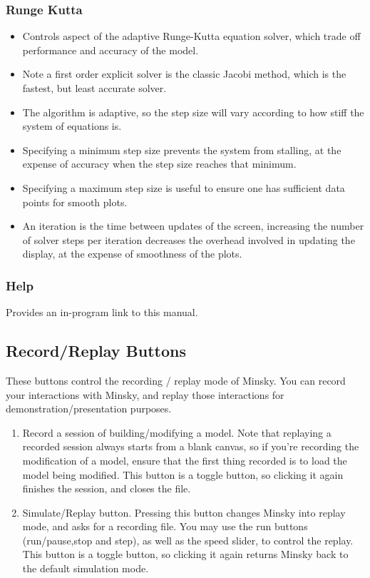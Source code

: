 \subsubsection{Runge Kutta}
\label{RungeKutta}

\begin{itemize}
\item Controls aspect of the adaptive Runge-Kutta equation solver, which
trade off performance and accuracy of the model. 
\item Note a first order explicit solver is the classic Jacobi method, which is the fastest,
but least accurate solver. 
\item The algorithm is adaptive, so the
step size will vary according to how stiff the system of equations
is. 
\item Specifying a minimum step size prevents the system from stalling,
at the expense of accuracy when the step size reaches that
minimum. 
\item Specifying a maximum step size is useful to ensure one has
sufficient data points for smooth plots.
\item An iteration is the time between updates of the screen, increasing the
number of solver steps per iteration decreases the overhead involved
in updating the display, at the expense of smoothness of the plots.
\end{itemize}

\subsubsection{Help}
\label{Help}

Provides an in-program link to this manual.

\subsection{Record/Replay Buttons}
\label{RecReplayButtons}


These buttons control the recording / replay mode of Minsky. You can
record your interactions with Minsky, and replay those interactions
for demonstration/presentation purposes. 

\begin{enumerate}
  \item Record a session of building/modifying a model. Note that
    replaying a recorded session always starts from a blank canvas, so
    if you're recording the modification of a model, ensure that the
    first thing recorded is to load the model being modified. This
    button is a toggle button, so clicking it again finishes the
    session, and closes the file.
  \item Simulate/Replay button. Pressing this button changes Minsky
    into replay mode, and asks for a recording file. You may use the
    run buttons (run/pause,stop and step), as well as the speed
    slider, to control the replay. This button is a toggle button, so
    clicking it again returns Minsky back to the default simulation
    mode.
\end{enumerate}


